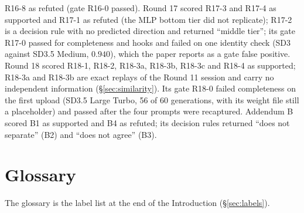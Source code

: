 \documentclass[11pt]{article}
\begin{document}
R16-8 as refuted (gate R16-0 passed). Round 17 scored R17-3 and R17-4 as supported and R17-1 as refuted (the MLP bottom tier did not replicate); R17-2 is a decision rule with no predicted direction and returned ``middle tier''; its gate R17-0 passed for completeness and hooks and failed on one identity check (SD3 against SD3.5 Medium, $0.940$), which the paper reports as a gate false positive. Round 18 scored R18-1, R18-2, R18-3a, R18-3b, R18-3c and R18-4 as supported; R18-3a and R18-3b are exact replays of the Round 11 session and carry no independent information (\S\ref{sec:similarity}). Its gate R18-0 failed completeness on the first upload (SD3.5 Large Turbo, 56 of 60 generations, with its weight file still a placeholder) and passed after the four prompts were recaptured. Addendum B scored B1 as supported and B4 as refuted; its decision rules returned ``does not separate'' (B2) and ``does not agree'' (B3).

\section{Glossary}\label{app:glossary}
The glossary is the label list at the end of the Introduction (\S\ref{sec:labels}).
\end{document}
